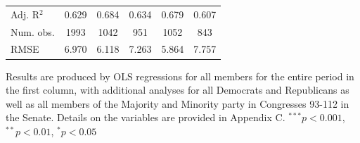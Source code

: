 \documentclass[12pt]{article}
\newcommand\fnote[1]{\captionsetup{font=normalsize}\caption*{#1}}
\begin{document}
\begin{table}[H]
\begin{threeparttable}
\begin{tabular}{l c c c c c }
Adj. R$^2$             & 0.629          & 0.684         & 0.634          & 0.679          & 0.607         \\
Num. obs.              & 1993           & 1042          & 951            & 1052           & 843           \\
RMSE                   & 6.970          & 6.118         & 7.263          & 5.864          & 7.757         \\
\hline
\end{tabular}
\begin{tablenotes}
   \item
   Results are produced by OLS regressions for all members for the entire period in the first column, with additional analyses for all Democrats and Republicans as well as all members of the Majority and Minority party in Congresses 93-112 in the Senate. Details on the variables are provided in Appendix C.
$^{***}p<0.001$, $^{**}p<0.01$, $^*p<0.05$
 \end{tablenotes}
\end{threeparttable}
\end{table}
\end{document}
